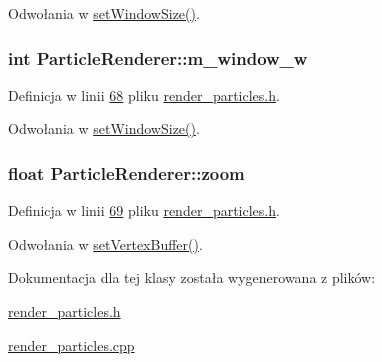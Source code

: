 Odwołania w \hyperlink{render__particles_8h_source_l00050}{set\-Window\-Size()}.

\hypertarget{class_particle_renderer_aa71b7eba5d5665a086b7ba80adddf19b}{
\subsubsection[{m\-\_\-window\-\_\-w}]{\setlength{\rightskip}{0pt plus 5cm}int Particle\-Renderer\-::m\-\_\-window\-\_\-w\hspace{0.3cm}{\ttfamily [protected]}}}\label{class_particle_renderer_aa71b7eba5d5665a086b7ba80adddf19b}


Definicja w linii \hyperlink{render__particles_8h_source_l00068}{68} pliku \hyperlink{render__particles_8h_source}{render\-\_\-particles.\-h}.



Odwołania w \hyperlink{render__particles_8h_source_l00050}{set\-Window\-Size()}.

\hypertarget{class_particle_renderer_a065df5c32be72505267048490bd0b3cf}{
\subsubsection[{zoom}]{\setlength{\rightskip}{0pt plus 5cm}float Particle\-Renderer\-::zoom\hspace{0.3cm}{\ttfamily [protected]}}}\label{class_particle_renderer_a065df5c32be72505267048490bd0b3cf}


Definicja w linii \hyperlink{render__particles_8h_source_l00069}{69} pliku \hyperlink{render__particles_8h_source}{render\-\_\-particles.\-h}.



Odwołania w \hyperlink{render__particles_8cpp_source_l00048}{set\-Vertex\-Buffer()}.



Dokumentacja dla tej klasy została wygenerowana z plików\-:\begin{DoxyCompactItemize}
\item 
\hyperlink{render__particles_8h}{render\-\_\-particles.\-h}\item 
\hyperlink{render__particles_8cpp}{render\-\_\-particles.\-cpp}\end{DoxyCompactItemize}
